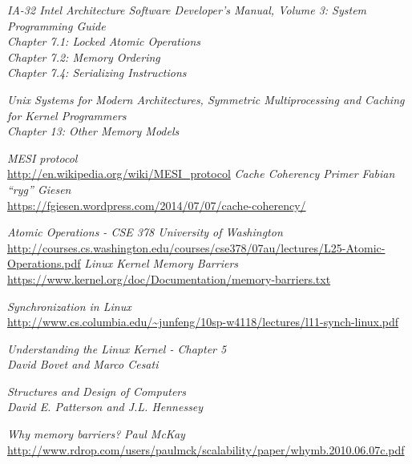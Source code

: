 \documentclass{article}
\begin{document}
\begin{thebibliography}{9}

  \textit{IA-32 Intel Architecture Software Developer's Manual, Volume 3:
    System Programming Guide} \\
  \textit{Chapter 7.1: Locked Atomic Operations} \\
  \textit{Chapter 7.2: Memory Ordering}  \\
  \textit{Chapter 7.4: Serializing Instructions}

  \textit{Unix Systems for Modern Architectures, Symmetric Multiprocessing and Caching
    for Kernel Programmers} \\
  \textit{Chapter 13: Other Memory Models}  
  
  \textit{MESI protocol}  \\
  \url{http://en.wikipedia.org/wiki/MESI_protocol}
   \textit{Cache Coherency Primer}  \textit{Fabian “ryg” Giesen} \\
   \url{https://fgiesen.wordpress.com/2014/07/07/cache-coherency/}

   \textit{Atomic Operations - CSE 378 University of Washington} \\
  \url{http://courses.cs.washington.edu/courses/cse378/07au/lectures/L25-Atomic-Operations.pdf}
  \textit{Linux Kernel Memory Barriers} \\
  \url{https://www.kernel.org/doc/Documentation/memory-barriers.txt}

  \textit{Synchronization in Linux} \\
  \url{http://www.cs.columbia.edu/~junfeng/10sp-w4118/lectures/l11-synch-linux.pdf}

  \textit{Understanding the Linux Kernel - Chapter 5} \\
  \textit{David Bovet and Marco Cesati}  

  \textit{Structures and Design of Computers } \\
  \textit{David E. Patterson and J.L. Hennessey} 
  
  \textit{Why memory barriers?}
  \textit{Paul McKay}
  \url{http://www.rdrop.com/users/paulmck/scalability/paper/whymb.2010.06.07c.pdf}


\end{thebibliography}
\end{document}
